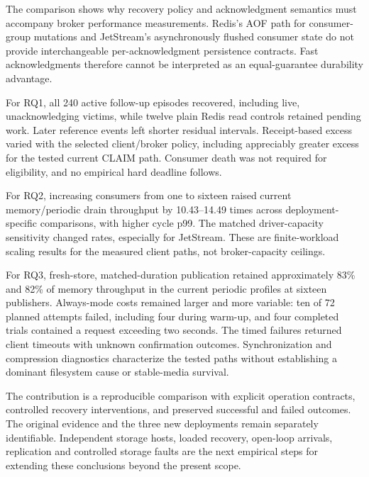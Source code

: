 The comparison shows why recovery policy and acknowledgment semantics must accompany broker performance measurements. Redis's AOF path for consumer-group mutations and JetStream's asynchronously flushed consumer state do not provide interchangeable per-acknowledgment persistence contracts. Fast acknowledgments therefore cannot be interpreted as an equal-guarantee durability advantage.

For RQ1, all 240 active follow-up episodes recovered, including live, unacknowledging victims, while twelve plain Redis read controls retained pending work. Later reference events left shorter residual intervals. Receipt-based excess varied with the selected client/broker policy, including appreciably greater excess for the tested current CLAIM path. Consumer death was not required for eligibility, and no empirical hard deadline follows.

For RQ2, increasing consumers from one to sixteen raised current memory/periodic drain throughput by 10.43--14.49 times across deployment-specific comparisons, with higher cycle p99. The matched driver-capacity sensitivity changed rates, especially for JetStream. These are finite-workload scaling results for the measured client paths, not broker-capacity ceilings.

For RQ3, fresh-store, matched-duration publication retained approximately 83\% and 82\% of memory throughput in the current periodic profiles at sixteen publishers. Always-mode costs remained larger and more variable: ten of 72 planned attempts failed, including four during warm-up, and four completed trials contained a request exceeding two seconds. The timed failures returned client timeouts with unknown confirmation outcomes. Synchronization and compression diagnostics characterize the tested paths without establishing a dominant filesystem cause or stable-media survival.

The contribution is a reproducible comparison with explicit operation contracts, controlled recovery interventions, and preserved successful and failed outcomes. The original evidence and the three new deployments remain separately identifiable. Independent storage hosts, loaded recovery, open-loop arrivals, replication and controlled storage faults are the next empirical steps for extending these conclusions beyond the present scope.
